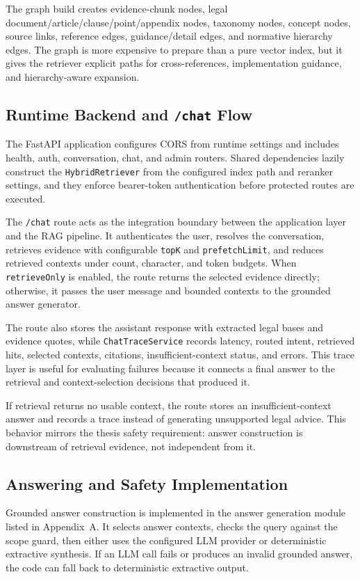 The graph build creates evidence-chunk nodes, legal document/article/clause/point/appendix nodes, taxonomy nodes, concept nodes, source links, reference edges, guidance/detail edges, and normative hierarchy edges. The graph is more expensive to prepare than a pure vector index, but it gives the retriever explicit paths for cross-references, implementation guidance, and hierarchy-aware expansion.

\subsection{Runtime Backend and \texttt{/chat} Flow}
The FastAPI application configures CORS from runtime settings and includes health, auth, conversation, chat, and admin routers. Shared dependencies lazily construct the \texttt{HybridRetriever} from the configured index path and reranker settings, and they enforce bearer-token authentication before protected routes are executed.

The \texttt{/chat} route acts as the integration boundary between the application layer and the RAG pipeline. It authenticates the user, resolves the conversation, retrieves evidence with configurable \texttt{topK} and \texttt{prefetchLimit}, and reduces retrieved contexts under count, character, and token budgets. When \texttt{retrieveOnly} is enabled, the route returns the selected evidence directly; otherwise, it passes the user message and bounded contexts to the grounded answer generator.

The route also stores the assistant response with extracted legal bases and evidence quotes, while \texttt{ChatTraceService} records latency, routed intent, retrieved hits, selected contexts, citations, insufficient-context status, and errors. This trace layer is useful for evaluating failures because it connects a final answer to the retrieval and context-selection decisions that produced it.

If retrieval returns no usable context, the route stores an insufficient-context answer and records a trace instead of generating unsupported legal advice. This behavior mirrors the thesis safety requirement: answer construction is downstream of retrieval evidence, not independent from it.

\subsection{Answering and Safety Implementation}
Grounded answer construction is implemented in the answer generation module listed in Appendix~A. It selects answer contexts, checks the query against the scope guard, then either uses the configured LLM provider or deterministic extractive synthesis. If an LLM call fails or produces an invalid grounded answer, the code can fall back to deterministic extractive output.

